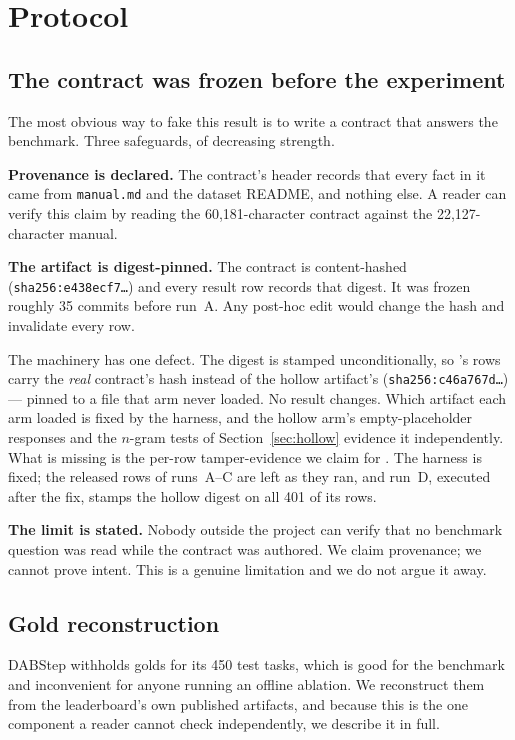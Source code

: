 \section{Protocol}
\label{sec:protocol}

\subsection{The contract was frozen before the experiment}

The most obvious way to fake this result is to write a contract that answers
the benchmark. Three safeguards, of decreasing strength.

\textbf{Provenance is declared.} The contract's header records that every fact
in it came from \texttt{manual.md} and the dataset README, and nothing else. A
reader can verify this claim by reading the 60{,}181-character contract against
the 22{,}127-character manual.

\textbf{The artifact is digest-pinned.} The contract is content-hashed
(\texttt{sha256:e438ecf7\ldots}) and every result row records that digest. It
was frozen roughly 35 commits before run~A. Any post-hoc edit would change the
hash and invalidate every row.

The machinery has one defect. The digest is stamped unconditionally, so
\armH{}'s rows carry the \emph{real} contract's hash instead of the hollow
artifact's (\texttt{sha256:c46a767d\ldots}) --- pinned to a file that arm never
loaded. No result changes. Which artifact each arm loaded is fixed by the
harness, and the hollow arm's empty-placeholder responses and the $n$-gram
tests of Section~\ref{sec:hollow} evidence it independently. What is missing is
the per-row tamper-evidence we claim for \armH{}. The harness is fixed; the
released rows of runs~A--C are left as they ran, and run~D, executed after the
fix, stamps the hollow digest on all 401 of its \armH{} rows.

\textbf{The limit is stated.} Nobody outside the project can verify that no
benchmark question was read while the contract was authored. We claim
provenance; we cannot prove intent. This is a genuine limitation and we do not
argue it away.

\subsection{Gold reconstruction}
\label{sec:golds}

DABStep withholds golds for its 450 test tasks, which is good for the benchmark
and inconvenient for anyone running an offline ablation. We reconstruct them
from the leaderboard's own published artifacts, and because this is the one
component a reader cannot check independently, we describe it in full.

